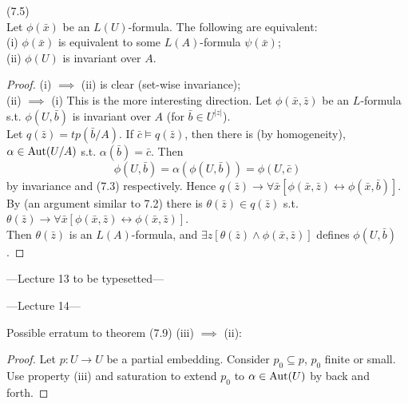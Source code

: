 \documentclass[a4paper]{article}
\begin{document}
\begin{prop} (7.5)\\
    Let $\phi(\bar{x})$ be an $L(U)$-formula. The following are equivalent:\\
    (i) $\phi(\bar{x})$ is equivalent to some $L(A)$-formula $\psi(\bar{x})$;\\
    (ii) $\phi(U)$ is invariant over $A$.
    \begin{proof}
        (i) $\implies$ (ii) is clear (set-wise invariance);\\
        (ii) $\implies$ (i) This is the more interesting direction. Let $\phi(\bar{x},\bar{z})$ be an $L$-formula s.t. $\phi(U,\bar{b})$ is invariant over $A$ (for $\bar{b} \in U^{|z|}$).\\
        Let $q(\bar{z}) = tp(\bar{b}/A)$. If $\bar{c} \vDash q(\bar{z})$, then there is (by homogeneity), $\alpha \in \operatorname{Aut} (U/A)$ s.t. $\alpha(\bar{b}) = \bar{c}$. Then 
        $$\phi(U,\bar{b}) = \alpha(\phi(U,\bar{b})) = \phi(U,\bar{c})$$
        by invariance and (7.3) respectively. Hence $q(\bar{z}) \to \forall \bar{x} [\phi(\bar{x},\bar{z}) \leftrightarrow \phi(\bar{x},\bar{b})]$. By (an argument similar to 7.2) there is $\theta(\bar{z}) \in q(\bar{z})$ s.t. $\theta(\bar{z}) \to \forall \bar{x}[\phi(\bar{x},\bar{z}) \leftrightarrow \phi(\bar{x},\bar{z})]$.\\
        Then $\theta(\bar{z})$ is an $L(A)$-formula, and $\exists z [\theta(\bar{z}) \wedge \phi(\bar{x},\bar{z})]$ defines $\phi(U,\bar{b})$.
    \end{proof}
\end{prop}

---Lecture 13 to be typesetted---

---Lecture 14---

Possible erratum to theorem (7.9) (iii) $\implies$ (ii): 
\begin{proof}
    Let $p:U \to U$ be a partial embedding. Consider $p_0 \subseteq p$, $p_0$ finite or small. Use property (iii) and saturation to extend $p_0$ to $\alpha \in \operatorname{Aut}(U)$ by back and forth.
\end{proof}
\end{document}
